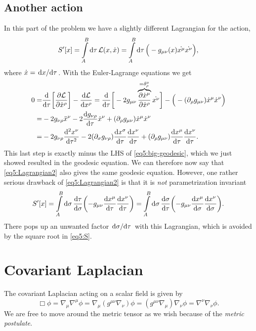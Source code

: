 \documentclass[11pt,a4paper, 
swedish, english %
]{article}
\begin{document}
\subsection{Another action}
In this part of the problem we have a slightly different Lagrangian
for the action,
\begin{equation}\label{eq5:Lagrangian2}
S'[x]=\int_A^B\rd\tau\,\mathcal{L}(x,\dot{x})
=\int_A^B\rd\tau\,\Big(-g_{\mu\nu}(x)\dot{x^\mu}\dot{x^\nu}\Big),
\end{equation}
where $\dot{x}=\dv*{x}{\tau}$. With the Euler-Lagrange equations we
get
\vspace{-1ex}
\begin{equation}
\begin{aligned}
0=&
\dv{\tau}\qty[\pdv{\mathcal{L}}{\dot{x}^\rho}]
-\dv{\mathcal{L}}{{x}^\rho}
=\dv{\tau}\bigg[-2g_{\mu\nu}
\overbrace{\pdv{\dot{x}^\mu}{\dot{x}^\rho}}^{=\delta^\mu_\rho}
\dot{x^\nu}\bigg]
-\Big(-(\partial_{\rho}g_{\mu\nu})\dot{x}^{\mu}\dot{x}^\nu\Big)\\
=&-2g_{\nu\rho}\ddot{x}^\nu
-2\dv{g_{\nu\rho}}{\tau}\dot{x}^\nu
+(\partial_{\rho}g_{\mu\nu})\dot{x}^{\mu}\dot{x}^\nu\\
=&-2g_{\nu\rho}\dv[2]{x^\nu}{\tau}
-2(\partial_{\sigma}g_{\nu\rho})\dv{x^\sigma}{\tau}\dv{x^\nu}{\tau}
+(\partial_{\rho}g_{\mu\nu})\dv{x^{\mu}}{\tau}\dv{x^\nu}{\tau}.
\end{aligned}
\end{equation}
This last step is exactly minus the LHS of \eqref{eq5:big-geodesic},
which we just showed resulted in the geodesic equation. We can
therefore now say that \eqref{eq5:Lagrangian2} also gives the same
geodesic equation. However, one rather serious drawback of
\eqref{eq5:Lagrangian2} is that it is \emph{not} parametrization
invariant
\begin{equation}
S'[x]=\int_A^B\rd\sigma\,\dv{\tau}{\sigma}
\qty(-g_{\mu\nu}\dv{x^\mu}{\tau}\dv{x^\nu}{\tau})
=\int_A^B\rd\sigma\,\dv{\sigma}{\tau}
\qty(-g_{\mu\nu}\dv{x^\mu}{\sigma}\dv{x^\nu}{\sigma}).
\end{equation}
There pops up an unwanted factor $\dv*{\sigma}{\tau}$ with this
Lagrangian, which is avoided by the square root in \eqref{eq5:S}.

\section{Covariant Laplacian}
\swapcommands{\phi}{\varphi}
The covariant Laplacian acting on a scalar field is given by
\begin{equation}
\Box\phi=\nabla_\mu\nabla^\mu\phi=\nabla_\mu(g^{\mu\nu}\nabla_\nu)\phi
=(g^{\mu\nu}\nabla_\mu)\nabla_\nu\phi
=\nabla^\nu\nabla_\nu\phi.
\end{equation}
We are free to move around the metric tensor as we wish because of the
\emph{metric postulate}.
\end{document}
